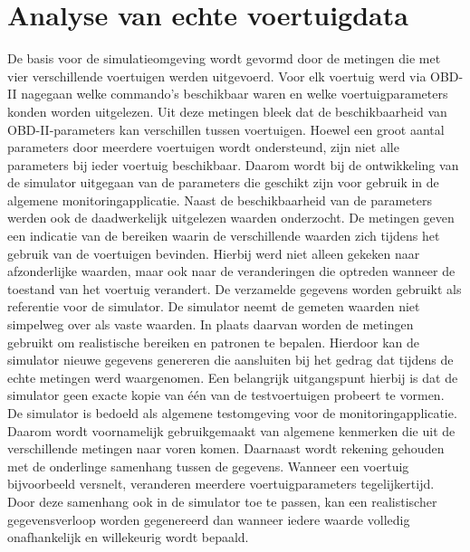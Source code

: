 \section{Analyse van echte voertuigdata}
De basis voor de simulatieomgeving wordt gevormd door de metingen die met vier verschillende voertuigen werden uitgevoerd. Voor elk voertuig werd via OBD-II nagegaan welke commando's beschikbaar waren en welke voertuigparameters konden worden uitgelezen.
Uit deze metingen bleek dat de beschikbaarheid van OBD-II-parameters kan verschillen tussen voertuigen. Hoewel een groot aantal parameters door meerdere voertuigen wordt ondersteund, zijn niet alle parameters bij ieder voertuig beschikbaar. Daarom wordt bij de ontwikkeling van de simulator uitgegaan van de parameters die geschikt zijn voor gebruik in de algemene monitoringapplicatie.
Naast de beschikbaarheid van de parameters werden ook de daadwerkelijk uitgelezen waarden onderzocht. De metingen geven een indicatie van de bereiken waarin de verschillende waarden zich tijdens het gebruik van de voertuigen bevinden. Hierbij werd niet alleen gekeken naar afzonderlijke waarden, maar ook naar de veranderingen die optreden wanneer de toestand van het voertuig verandert.
De verzamelde gegevens worden gebruikt als referentie voor de simulator. De simulator neemt de gemeten waarden niet simpelweg over als vaste waarden. In plaats daarvan worden de metingen gebruikt om realistische bereiken en patronen te bepalen. Hierdoor kan de simulator nieuwe gegevens genereren die aansluiten bij het gedrag dat tijdens de echte metingen werd waargenomen.
Een belangrijk uitgangspunt hierbij is dat de simulator geen exacte kopie van één van de testvoertuigen probeert te vormen. De simulator is bedoeld als algemene testomgeving voor de monitoringapplicatie. Daarom wordt voornamelijk gebruikgemaakt van algemene kenmerken die uit de verschillende metingen naar voren komen.
Daarnaast wordt rekening gehouden met de onderlinge samenhang tussen de gegevens. Wanneer een voertuig bijvoorbeeld versnelt, veranderen meerdere voertuigparameters tegelijkertijd. Door deze samenhang ook in de simulator toe te passen, kan een realistischer gegevensverloop worden gegenereerd dan wanneer iedere waarde volledig onafhankelijk en willekeurig wordt bepaald.

